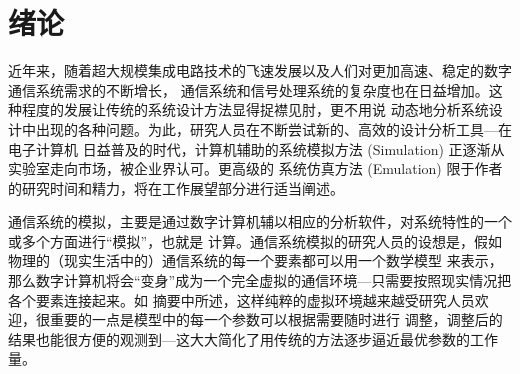 
\chapter{绪论}\label{Introduction}
近年来，随着超大规模集成电路技术的飞速发展以及人们对更加高速、稳定的数字通信系统需求的不断增长，
通信系统和信号处理系统的复杂度也在日益增加。这种程度的发展让传统的系统设计方法显得捉襟见肘，更不用说
动态地分析系统设计中出现的各种问题。为此，研究人员在不断尝试新的、高效的设计分析工具---在电子计算机
日益普及的时代，计算机辅助的系统模拟方法 (Simulation) 正逐渐从实验室走向市场，被企业界认可。更高级的
系统仿真方法 (Emulation) 限于作者的研究时间和精力，将在工作展望部分进行适当阐述。
\par
通信系统的模拟，主要是通过数字计算机辅以相应的分析软件，对系统特性的一个或多个方面进行“模拟”，也就是
计算。通信系统模拟的研究人员的设想是，假如物理的（现实生活中的）通信系统的每一个要素都可以用一个数学模型
来表示，那么数字计算机将会“变身”成为一个完全虚拟的通信环境---只需要按照现实情况把各个要素连接起来。如
摘要中所述，这样纯粹的虚拟环境越来越受研究人员欢迎，很重要的一点是模型中的每一个参数可以根据需要随时进行
调整，调整后的结果也能很方便的观测到---这大大简化了用传统的方法逐步逼近最优参数的工作量。

